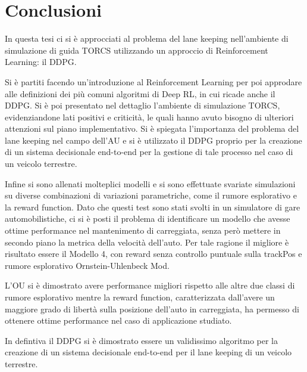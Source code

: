 \chapter*{Conclusioni}

In questa tesi ci si è approcciati al problema del lane keeping nell'ambiente di simulazione di guida TORCS utilizzando un approccio di Reinforcement Learning: il DDPG.
\newline

Si è partiti facendo un'introduzione al Reinforcement Learning per poi approdare alle definizioni dei più comuni algoritmi di Deep RL, in cui ricade anche il DDPG. Si è poi presentato nel dettaglio l'ambiente di simulazione TORCS, evidenziandone lati positivi e criticità, le quali hanno avuto bisogno di ulteriori attenzioni sul piano implementativo. Si è spiegata l'importanza del problema del lane keeping nel campo dell'AU e si è utilizzato il DDPG proprio per la creazione di un sistema decisionale end-to-end per la gestione di tale processo nel caso di un veicolo terrestre.
\newline

Infine si sono allenati molteplici modelli e si sono effettuate svariate simulazioni su diverse combinazioni di variazioni parametriche, come il rumore esplorativo e la reward function. Dato che questi test sono stati svolti in un simulatore di gare automobilistiche, ci si è posti il problema di identificare un modello che avesse ottime performance nel mantenimento di carreggiata, senza però mettere in secondo piano la metrica della velocità dell'auto. Per tale ragione il migliore è risultato essere il Modello 4, con reward senza controllo puntuale sulla trackPos e rumore esplorativo Ornstein-Uhlenbeck Mod.
\newline

L'OU si è dimostrato avere performance migliori rispetto alle altre due classi di rumore esplorativo mentre la reward function, caratterizzata dall'avere un maggiore grado di libertà sulla posizione dell'auto in carreggiata, ha permesso di ottenere ottime performance nel caso di applicazione studiato.
\newline

In defintiva il DDPG si è dimostrato essere un validissimo algoritmo per la creazione di un sistema decisionale end-to-end per il lane keeping di un veicolo terrestre.